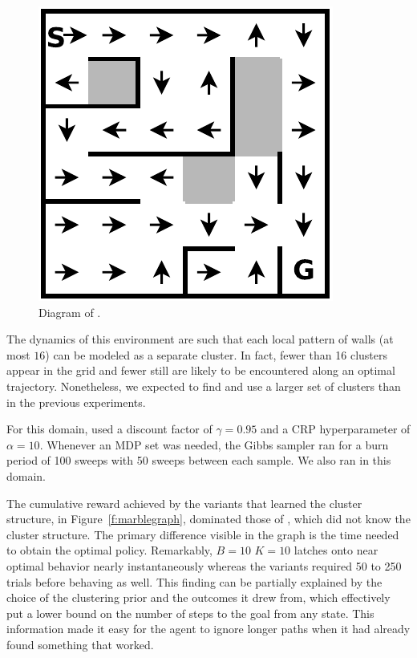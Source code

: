 \begin{figure}[t]
\begin{center}
\includegraphics[width=0.6\linewidth]{6x6_maze}
\caption{Diagram of .}
\label{f:marble}
\end{center}
\end{figure}

The dynamics of this environment are such that each local pattern of
walls (at most $16$) can be modeled as a separate cluster.  In fact,
fewer than 16 clusters appear in the grid and fewer still are likely
to be encountered along an optimal trajectory.  Nonetheless, we
expected  to find and use a larger set of clusters than in the
previous experiments.

For this domain,  used a discount factor of $\gamma=0.95$ and a
CRP hyperparameter of $\alpha=10$.  Whenever an MDP set was needed,
the Gibbs sampler ran for a burn period of 100 sweeps with 50 sweeps
between each sample.  We also ran  in this domain.

The cumulative
reward achieved by the  variants that learned the cluster
structure, in Figure~\ref{f:marblegraph}, dominated those of , which did not know the cluster
structure.  The primary difference visible in the graph is the time
needed to obtain the optimal policy.  Remarkably,  $B=10$ $K=10$
latches onto near optimal behavior nearly instantaneously whereas the
 variants required 50 to 250 trials before behaving as well.
This finding can be partially explained by the choice of the clustering prior
and the outcomes it drew from, which effectively put a lower bound on
the number of steps to the goal from any state.  This information made it easy for
the agent to ignore longer paths when it had already found something that
worked.

